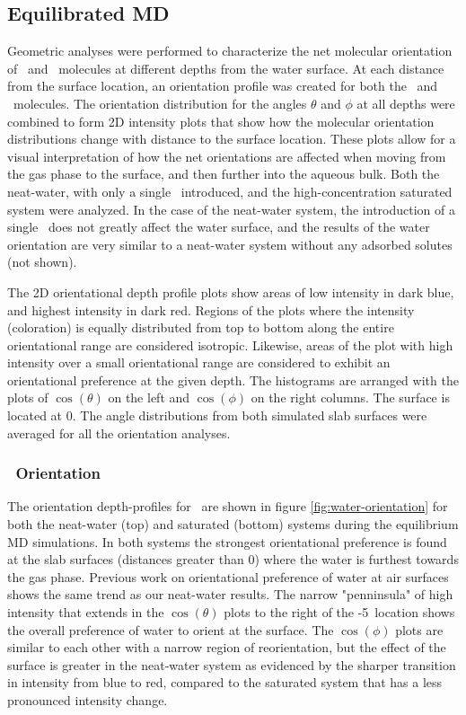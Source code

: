 \subsection{Equilibrated MD}

Geometric analyses were performed to characterize the net molecular orientation of \wat~and \suldiox~molecules at different depths from the water surface. At each distance from the surface location, an orientation profile was created for both the \wat~and \suldiox~molecules. The orientation distribution for the angles $\theta$ and $\phi$ at all depths were combined to form 2D intensity plots that show how the molecular orientation distributions change with distance to the surface location. These plots allow for a visual interpretation of how the net orientations are affected when moving from the gas phase to the surface, and then further into the aqueous bulk. Both the neat-water, with only a single \suldiox~introduced, and the high-concentration saturated system were analyzed. In the case of the neat-water system, the introduction of a single \suldiox~does not greatly affect the water surface, and the results of the water orientation are very similar to a neat-water system without any adsorbed solutes (not shown).

The 2D orientational depth profile plots show areas of low intensity in dark blue, and highest intensity in dark red. Regions of the plots where the intensity (coloration) is equally distributed from top to bottom along the entire orientational range are considered isotropic. Likewise, areas of the plot with high intensity over a small orientational range are considered to exhibit an orientational preference at the given depth.  The histograms are arranged with the plots of $\cos(\theta)$ on the left and $\cos(\phi)$ on the right columns. The surface is located at 0\angs. The angle distributions from both simulated slab surfaces were averaged for all the orientation analyses.

\subsubsection{\wat~Orientation}

The orientation depth-profiles for \wat~are shown in figure \ref{fig:water-orientation} for both the neat-water (top) and saturated (bottom) systems during the equilibrium MD simulations. In both systems the strongest orientational preference is found at the slab surfaces (distances greater than 0\angs) where the water is furthest towards the gas phase. Previous work on orientational preference of water at air surfaces shows the same trend as our neat-water results.\cite{Walker2006b,Hore2008} The narrow "penninsula" of high intensity that extends in the $\cos(\theta)$ plots to the right of the -5\angs~location shows the overall preference of water to orient at the surface. The $\cos(\phi)$ plots are similar to each other with a narrow region of reorientation, but the effect of the surface is greater in the neat-water system as evidenced by the sharper transition in intensity from blue to red, compared to the saturated system that has a less pronounced intensity change.

